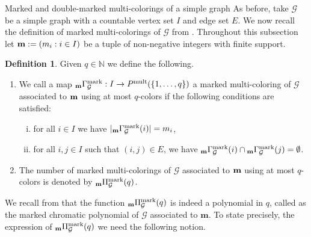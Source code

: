 \documentclass[11pt,reqno]{amsart}
\makeatletter
\numberwithin{equation}{section} %
\theoremstyle{definition}
\newtheorem{defn}{Definition}
\theoremstyle{remark}
\numberwithin{equation}{section}
\def\section{\def\@secnumfont{\mdseries}\@startsection{section}{1}%
  \z@{.7\linespacing\@plus\linespacing}{.5\linespacing}%
  {\normalfont\scshape\centering}}
\makeatother
\begin{document}
\section{Marked and double-marked multi-colorings of a simple graph}\label{sect5}
As before, take $\mathcal{G}$ be a simple graph with a countable vertex set $I$ and edge set $E.$
We now recall the definition of marked multi-colorings of  $\mathcal{G}$ from \cite[Section 3.1]{CDV}. Throughout this subsection let $\bold{m}:=(m_i:i\in I)$ be a tuple of non-negative integers with finite support.
\begin{defn} Given $q\in\mathbb{N}$ we define the following.
\begin{enumerate}
        \item We call a map $_{\bold{m}}\Gamma^{\mathrm{mark}}_\mathcal{G}:I\rightarrow P^{\mathrm{mult}}(\{1,\dots,q\})$ a marked multi-coloring of $\mathcal{G}$ associated to $\bold{m}$ using at most $q$-colors if the following conditions are satisfied:\vspace{0,1cm}
        
        \begin{enumerate}[(i)]
            \item for all $i\in I$ we have $|_{\bold{m}}\Gamma^{\mathrm{mark}}_\mathcal{G}(i)|=m_i$,\vspace{0,1cm}
            \item for all $i,j\in I$ such that $(i,j)\in E$, we have $_{\bold{m}}\Gamma^{\mathrm{mark}}_\mathcal{G}(i)\cap {_{\bold{m}}\Gamma^{\mathrm{mark}}_\mathcal{G}(j)}=\emptyset$.
            
        \end{enumerate}
       \vspace{0,1cm}
       
        \item The number of marked multi-colorings of $\mathcal{G}$ associated to $\bold{m}$  using at most $q$-colors %
        is denoted by $_{\bold{m}}\Pi^{\mathrm{mark}}_\mathcal{G}(q)$.
    \end{enumerate}
\end{defn}
We recall from  \cite[Proposition 3.1]{CDV} that the function $_{\bold{m}}\Pi^{\mathrm{mark}}_\mathcal{G}(q)$ is indeed a polynomial in $q$, called  as the marked chromatic polynomial of $\mathcal{G}$ associated to $\mathbf m$. To state precisely, the expression of $_{\bold{m}}\Pi^{\mathrm{mark}}_\mathcal{G}(q)$ we need the following notion.
\end{document}
